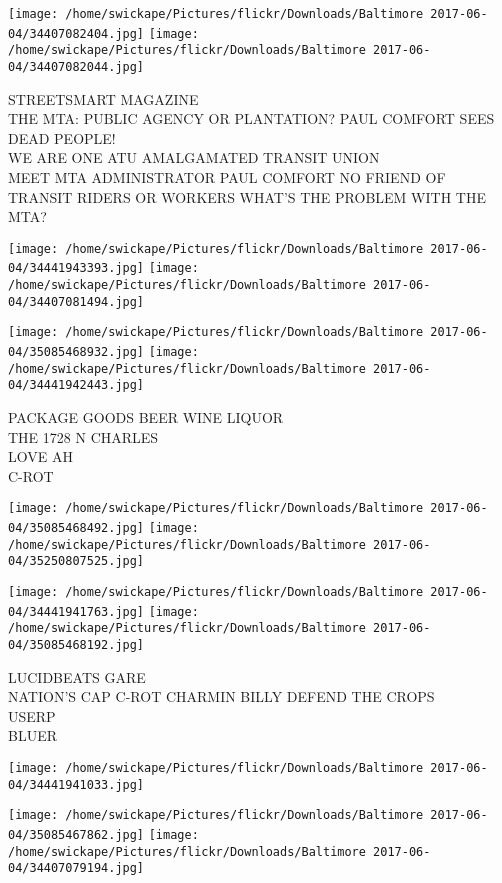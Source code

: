 \documentclass[10pt,letterpaper]{article}
\begin{document}
\texttt{[image: /home/swickape/Pictures/flickr/Downloads/Baltimore 2017-06-04/34407082404.jpg]}
\texttt{[image: /home/swickape/Pictures/flickr/Downloads/Baltimore 2017-06-04/34407082044.jpg]}

STREETSMART MAGAZINE\\
THE MTA: PUBLIC AGENCY OR PLANTATION?  PAUL COMFORT SEES DEAD PEOPLE!\\
WE ARE ONE ATU AMALGAMATED TRANSIT UNION\\
MEET MTA ADMINISTRATOR PAUL COMFORT NO FRIEND OF TRANSIT RIDERS OR WORKERS WHAT'S THE PROBLEM WITH THE MTA?\\
\pagebreak

\texttt{[image: /home/swickape/Pictures/flickr/Downloads/Baltimore 2017-06-04/34441943393.jpg]}
\texttt{[image: /home/swickape/Pictures/flickr/Downloads/Baltimore 2017-06-04/34407081494.jpg]}

\texttt{[image: /home/swickape/Pictures/flickr/Downloads/Baltimore 2017-06-04/35085468932.jpg]}
\texttt{[image: /home/swickape/Pictures/flickr/Downloads/Baltimore 2017-06-04/34441942443.jpg]}

PACKAGE GOODS BEER WINE LIQUOR\\
THE 1728 N CHARLES\\
LOVE AH\\
C{-}ROT\\
\pagebreak

\texttt{[image: /home/swickape/Pictures/flickr/Downloads/Baltimore 2017-06-04/35085468492.jpg]}
\texttt{[image: /home/swickape/Pictures/flickr/Downloads/Baltimore 2017-06-04/35250807525.jpg]}

\texttt{[image: /home/swickape/Pictures/flickr/Downloads/Baltimore 2017-06-04/34441941763.jpg]}
\texttt{[image: /home/swickape/Pictures/flickr/Downloads/Baltimore 2017-06-04/35085468192.jpg]}

LUCIDBEATS GARE\\
NATION'S CAP C{-}ROT CHARMIN BILLY DEFEND THE CROPS\\
USERP\\
BLUER\\
\pagebreak

\texttt{[image: /home/swickape/Pictures/flickr/Downloads/Baltimore 2017-06-04/34441941033.jpg]}

\vspace{0.25in}
\texttt{[image: /home/swickape/Pictures/flickr/Downloads/Baltimore 2017-06-04/35085467862.jpg]}
\texttt{[image: /home/swickape/Pictures/flickr/Downloads/Baltimore 2017-06-04/34407079194.jpg]}
\end{document}
